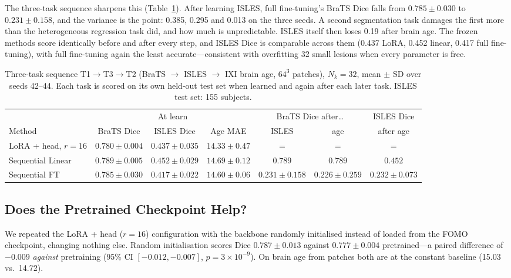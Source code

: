 \documentclass[journal,twoside,web]{ieeecolor}
\begin{document}
The three-task sequence sharpens this (Table~\ref{tab:three}). After learning ISLES, full fine-tuning's BraTS Dice falls from $0.785\pm0.030$ to $0.231\pm0.158$, and the variance is the point: 0.385, 0.295 and 0.013 on the three seeds. A second segmentation task damages the first more than the heterogeneous regression task did, and how much is unpredictable. ISLES itself then loses 0.19 after brain age. The frozen methods score identically before and after every step, and ISLES Dice is comparable across them (0.437 LoRA, 0.452 linear, 0.417 full fine-tuning), with full fine-tuning again the least accurate---consistent with overfitting 32 small lesions when every parameter is free.

\begin{table}[t]
\caption{Three-task sequence T1$\to$T3$\to$T2 (BraTS $\to$ ISLES $\to$ IXI brain age, $64^3$ patches), $N_k=32$, mean $\pm$ SD over seeds 42--44. Each task is scored on its own held-out test set when learned and again after each later task. ISLES test set: 155 subjects.}
\label{tab:three}
\centering
\footnotesize
\setlength{\tabcolsep}{3pt}
\begin{tabular}{lccc|cc|c}
\toprule
 & \multicolumn{3}{c|}{At learn} & \multicolumn{2}{c|}{BraTS Dice after\ldots} & ISLES Dice \\
Method & BraTS Dice & ISLES Dice & Age MAE & ISLES & age & after age \\
\midrule
LoRA + head, $r{=}16$ & $0.780\pm0.004$ & $0.437\pm0.035$ & $14.33\pm0.47$ & = & = & = \\
Sequential Linear     & $0.789\pm0.005$ & $\mathbf{0.452\pm0.029}$ & $14.69\pm0.12$ & $0.789$ & $0.789$ & $0.452$ \\
Sequential FT         & $0.785\pm0.030$ & $0.417\pm0.022$ & $14.60\pm0.06$ & $\mathbf{0.231\pm0.158}$ & $0.226\pm0.259$ & $\mathbf{0.232\pm0.073}$ \\
\bottomrule
\end{tabular}
\end{table}

\subsection{Does the Pretrained Checkpoint Help?}
\label{sec:res_pretrain}

We repeated the LoRA + head ($r{=}16$) configuration with the backbone randomly initialised instead of loaded from the FOMO checkpoint, changing nothing else. Random initialisation scores Dice $0.787\pm0.013$ against $0.777\pm0.004$ pretrained---a paired difference of $-0.009$ \emph{against} pretraining (95\% CI $[-0.012, -0.007]$, $p=3{\times}10^{-9}$). On brain age from patches both are at the constant baseline (15.03 vs.\ 14.72).
\end{document}

